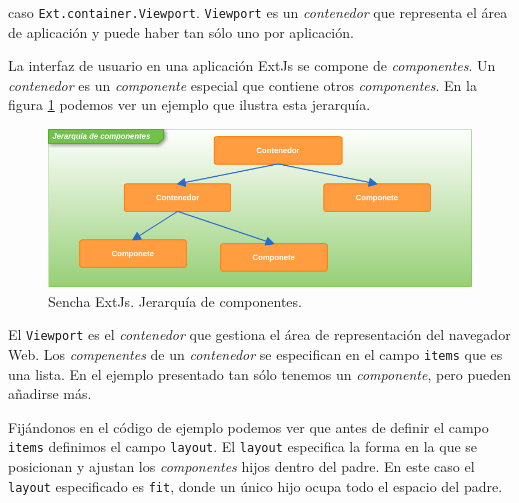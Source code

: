 	caso \texttt{Ext.container.Viewport}. \texttt{Viewport} es un \emph{contenedor} que representa el área de aplicación y puede haber tan sólo
	uno por aplicación. 
 	\par
	La interfaz de usuario en una aplicación ExtJs se compone de \emph{componentes}. Un \emph{contenedor} es un \emph{componente} especial que
	contiene otros \emph{componentes}. En la figura \ref{fig:comps} podemos ver un ejemplo que ilustra esta jerarquía.
	\begin{figure}[h]
		\centering
		\includegraphics[keepaspectratio, width=1\textwidth]{./img/comps.png}
		\caption{Sencha ExtJs. Jerarquía de componentes.}   
		\label{fig:comps}
	\end{figure}
 	\par
	El \texttt{Viewport} es el \emph{contenedor} que gestiona el área de representación del navegador Web. Los \emph{compenentes} de un
	\emph{contenedor} se especifican en el campo \texttt{items} que es una lista. En el ejemplo presentado tan sólo tenemos un \emph{componente},
	pero pueden añadirse más.
 	\par
	Fijándonos en el código de ejemplo podemos ver que antes de definir el campo \texttt{items} definimos el campo \texttt{layout}. El
	\texttt{layout} especifica la forma en la que se posicionan y ajustan los \emph{componentes} hijos dentro del padre. En este caso el
	\texttt{layout} especificado es \texttt{\cc fit\cc}, donde un único hijo ocupa todo el espacio del padre.
